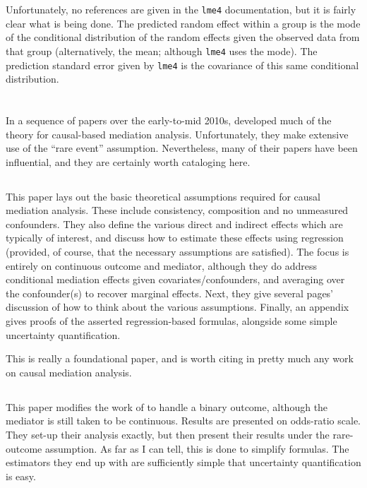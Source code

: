 \documentclass{report}
\begin{document}
Unfortunately, no references are given in the \texttt{lme4} documentation, but it is fairly clear what is being done. The predicted random effect within a group is the mode of the conditional distribution of the random effects given the observed data from that group (alternatively, the mean; although \texttt{lme4} uses the mode). The prediction standard error given by \texttt{lme4} is the covariance of this same conditional distribution. 


\section{\citeauthor{Van10}}

In a sequence of papers over the early-to-mid 2010s, \citeauthor{Van10} developed much of the theory for causal-based mediation analysis. Unfortunately, they make extensive use of the ``rare event'' assumption. Nevertheless, many of their papers have been influential, and they are certainly worth cataloging here.

\subsection{\citet{Van09}}

This paper lays out the basic theoretical assumptions required for causal mediation analysis. These include consistency, composition and no unmeasured confounders. They also define the various direct and indirect effects which are typically of interest, and discuss how to estimate these effects using regression (provided, of course, that the necessary assumptions are satisfied). The focus is entirely on continuous outcome and mediator, although they do address conditional mediation effects given covariates/confounders, and averaging over the confounder(s) to recover marginal effects. Next, they give several pages' discussion of how to think about the various assumptions. Finally, an appendix gives proofs of the asserted regression-based formulas, alongside some simple uncertainty quantification.

This is really a foundational paper, and is worth citing in pretty much any work on causal mediation analysis.

\subsection{\citet{Van10}}

This paper modifies the work of \citet{Van09} to handle a binary outcome, although the mediator is still taken to be continuous. Results are presented on odds-ratio scale. They set-up their analysis exactly, but then present their results under the rare-outcome assumption. As far as I can tell, this is done to simplify formulas. The estimators they end up with are sufficiently simple that uncertainty quantification is easy.
\end{document}
